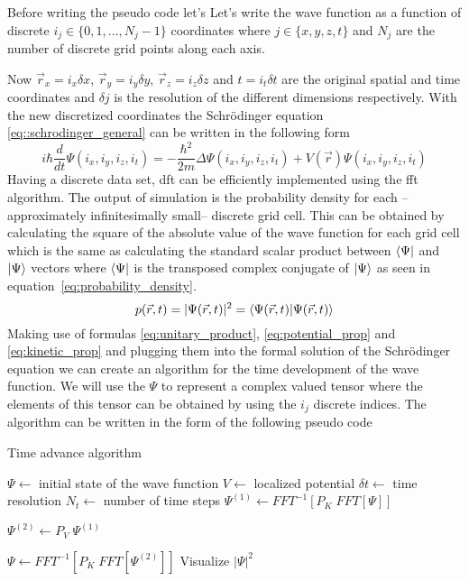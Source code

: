 Before writing the pseudo code let's 
Let's write the wave function as a function of discrete $i_j \in \{0, 1, \dots, N_j - 1\}$ coordinates where $j \in \{x, y, z, t\}$ and $N_j$ are the number of discrete grid points along each axis.

Now $\vec{r}_x = i_x \delta x$, $\vec{r}_y = i_y \delta y$, $\vec{r}_z = i_z \delta z$ and $t = i_t \delta t$ are the original spatial and time coordinates and $\delta j$ is the resolution of the different dimensions respectively.
With the new discretized coordinates the Schrödinger equation \ref{eq::schrodinger_general} can be written in the following form
\begin{equation}
	\label{eq:discretized_schrodinger}		
	i \hbar \frac{d}{dt}\Psi(i_x, i_y, i_z, i_t) = - \frac{\hbar^2}{2m}\Delta\Psi(i_x, i_y, i_z, i_t) + V(\vec{r})\Psi(i_x, i_y, i_z, i_t)
\end{equation}
Having a discrete data set, \acrfull{dft} can be efficiently implemented using the \acrfull{fft} algorithm.
The output of simulation is the probability density for each --approximately infinitesimally small-- discrete grid cell.
This can be obtained by calculating the square of the absolute value of the wave function for each grid cell which is the same as calculating the standard scalar product between $\bra{\Psi}$ and $\ket{\Psi}$ vectors where $\bra{\Psi}$ is the transposed complex conjugate of $\ket{\Psi}$ as seen in equation~\ref{eq:probability_density}.
\begin{equation}
	\label{eq:probability_density}
	p(\vec{r}, t) = |\Psi(\vec{r}, t)|^2 = \braket{\Psi(\vec{r}, t)}
\end{equation}
Making use of formulas \ref{eq:unitary_product}, \ref{eq:potential_prop} and \ref{eq:kinetic_prop} and plugging them into the formal solution of the Schrödinger equation we can create an algorithm for the time development of the wave function.
We will use the $\Psi$ to represent a complex valued tensor where the elements of this tensor can be obtained by using the $i_j$ discrete indices.
The algorithm can be written in the form of the following pseudo code

\begin{algorithm}
	\caption{Time advance algorithm}\label{alg:time_advance}
	\begin{algorithmic}
		\State $ \Psi \gets $ initial state of the wave function
		\State $ V \gets $ localized potential
		\State $ \delta t \gets $ time resolution
		\State $ N_t \gets $ number of time steps
		\For{$i \in [0, N_t)$}
			\State $\Psi^{(1)} \gets FFT^{-1}
			\left[
			P_K\; FFT\left[ \Psi \right]
			\right]
			$
			
			\State $\Psi^{(2)} \gets P_V\; \Psi^{(1)}$
			
			\State $\Psi \gets FFT^{-1}
			\left[
			P_K\; FFT\left[ \Psi^{(2)} \right]
			\right]
			$
			\State Visualize $|\Psi|^2$
		\EndFor
	\end{algorithmic}
\end{algorithm}

